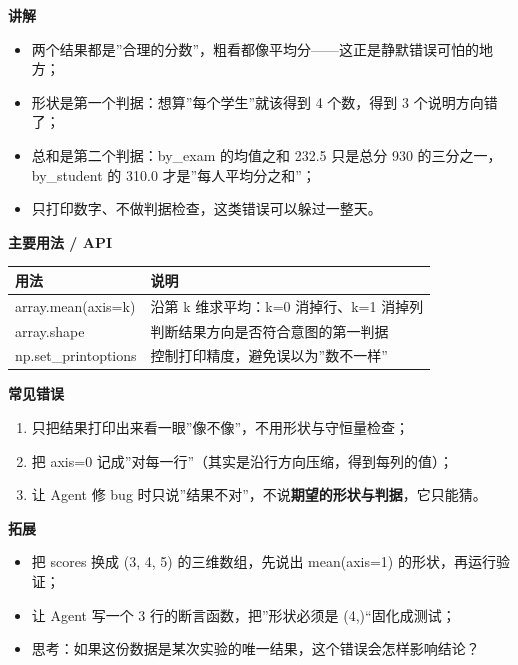 \documentclass[
]{article}
\newcounter{none} %
\providecommand{\tightlist}{%
  \setlength{\itemsep}{0pt}\setlength{\parskip}{0pt}}
\begin{document}
\textbf{讲解}

\begin{itemize}
\tightlist
\item
  两个结果都是''合理的分数''，粗看都像平均分------这正是静默错误可怕的地方；
\item
  形状是第一个判据：想算''每个学生''就该得到 4 个数，得到 3
  个说明方向错了；
\item
  总和是第二个判据：by\_exam 的均值之和 232.5 只是总分 930
  的三分之一，by\_student 的 310.0 才是''每人平均分之和''；
\item
  只打印数字、不做判据检查，这类错误可以躲过一整天。
\end{itemize}

\textbf{主要用法 / API}

{\def\LTcaptype{none} %
\begin{longtable}[]{@{}ll@{}}
\toprule\noalign{}
用法 & 说明 \\
\midrule\noalign{}
\endhead
\bottomrule\noalign{}
\endlastfoot
array.mean(axis=k) & 沿第 k 维求平均：k=0 消掉行、k=1 消掉列 \\
array.shape & 判断结果方向是否符合意图的第一判据 \\
np.set\_printoptions & 控制打印精度，避免误以为''数不一样'' \\
\end{longtable}
}

\textbf{常见错误}

\begin{enumerate}
\def\labelenumi{\arabic{enumi}.}
\tightlist
\item
  只把结果打印出来看一眼''像不像''，不用形状与守恒量检查；
\item
  把 axis=0 记成''对每一行''（其实是沿行方向压缩，得到每列的值）；
\item
  让 Agent 修 bug
  时只说''结果不对''，不说\textbf{期望的形状与判据}，它只能猜。
\end{enumerate}

\textbf{拓展}

\begin{itemize}
\tightlist
\item
  把 scores 换成 (3, 4, 5) 的三维数组，先说出 mean(axis=1)
  的形状，再运行验证；
\item
  让 Agent 写一个 3 行的断言函数，把''形状必须是 (4,)``固化成测试；
\item
  思考：如果这份数据是某次实验的唯一结果，这个错误会怎样影响结论？
\end{itemize}
\end{document}

